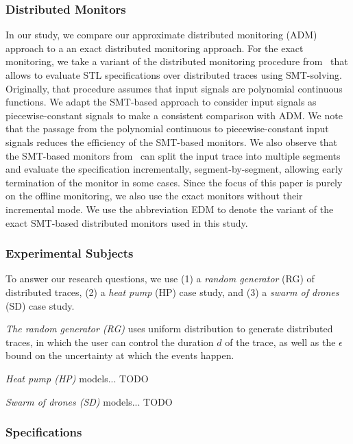 \subsubsection{Distributed Monitors} \label{sec:testGeneration}
In our study, we compare our approximate distributed monitoring (ADM) approach to a an exact distributed monitoring approach.
For the exact monitoring, we take a variant of the distributed monitoring procedure from~\cite{MomtazAB23} that allows to evaluate STL specifications over distributed traces using SMT-solving.
Originally, that procedure assumes that input signals are polynomial continuous functions.
We adapt the SMT-based approach to consider input signals as piecewise-constant signals to make a consistent comparison with ADM.
We note that the passage from the polynomial continuous to piecewise-constant input signals reduces the efficiency of the SMT-based monitors.
We also observe that the SMT-based monitors from~\cite{MomtazAB23} can split the input trace into multiple segments and evaluate the specification incrementally, segment-by-segment, allowing early termination of the monitor in some cases.
Since the focus of this paper is purely on the offline monitoring, we also use the exact monitors without their incremental mode.
We use the abbreviation EDM to denote the variant of the exact SMT-based distributed monitors used in this study.


\subsubsection{Experimental Subjects}
To answer our research questions, we use (1) a \emph{random generator} (RG) of distributed traces, (2) a \emph{heat pump} (HP) case study, and (3) a \emph{swarm of drones} (SD) case study.  

\noindent \emph{The random generator (RG)} uses uniform distribution to generate distributed traces, in which the user can control the duration $d$ of the trace, as well as the $\epsilon$ bound on the uncertainty at which the events happen.

\noindent \emph{Heat pump (HP)} models...
\alert{TODO}

\noindent \emph{Swarm of drones (SD)} models...
\alert{TODO}

\subsubsection{Specifications}

